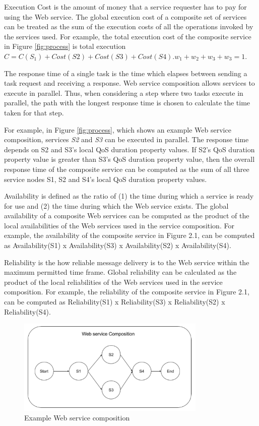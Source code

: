 Execution Cost is the amount of money that a service requester has to pay for using the Web service. The global execution cost of a composite set of services can be treated as the sum of the execution costs of all the operations invoked by the services used. For example, the total execution cost of the composite service in Figure \ref{fig:process} is total execution $C = C(S_{1}) + Cost(S2) + Cost(S3) + Cost(S4)$.$w_{1} + w_{2} + w_{3} + w_{3} = 1$.\par
The response time of a single task is the time which elapses between sending a task request and receiving a response. Web service composition allows services to execute in parallel. Thus, when considering a step where two tasks execute in parallel, the path with the longest response time is chosen to calculate the time taken for that step.\par
For example, in Figure \ref{fig:process}, which shows an example Web service composition, services \emph{S2} and \emph{S3} can be executed in parallel. The response time depends on S2 and S3's local QoS duration property values. If S2's QoS duration property value is greater than S3's QoS duration property value, then the overall response time of the composite service can be computed as the sum of all three service nodes S1, S2 and S4's local QoS duration property values.\par
Availability is defined as the ratio of (1) the time during which a service is ready for use and (2) the time during which the Web service exists. The global availability of a composite Web services can be computed as the product of the local availabilities of the Web services used in the service composition.  For example, the availability of the composite service in Figure 2.1, can be computed as Availability(S1) x Availability(S3) x  Availability(S2) x Availability(S4). \par
Reliability is the how reliable message delivery is to the Web service within the maximum permitted time frame. Global reliability can be calculated as the product of the local reliabilities of the Web services used in the service composition. For example, the reliability of the composite service in Figure 2.1, can be computed as Reliability(S1) x Reliability(S3) x Reliability(S2) x Reliability(S4). \par
\begin{figure}[H]
\includegraphics[width=9cm]{Figure2-1ExampleWebServiceComposition.png}
\centering
\caption{Example Web service composition}
\end{figure} 
